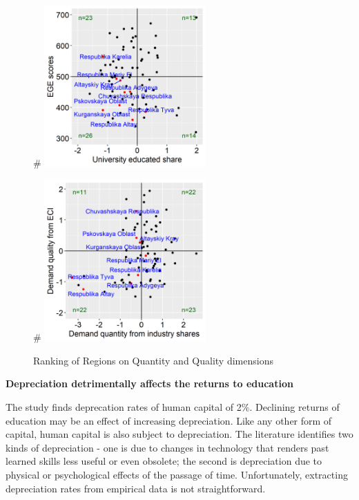 \documentclass[alpha-refs]{wiley-article-04t}
\begin{document}
\setcounter{table}{0}


\begin{figure}[htbp!]
	\begin{minipage}[b]{.5\linewidth}
		\centering
		#\hspace*{-0.2in}
		\includegraphics[width=175pt]{ranks1a.png}
	\end{minipage}
	\hfill
	\begin{minipage}[b]{.5\linewidth}
		\centering
		#\hspace*{-0.2in}
		\includegraphics[width=175pt]{ranks1b.png}
	\end{minipage}
	\caption{Ranking of Regions on Quantity and Quality 
	dimensions}\label{fig:4.2}
\end{figure}

\hspace{-1.75em} \textbf{Depreciation detrimentally affects the returns to 
education}

The study finds deprecation rates of human capital of 2\%. Declining 
returns of  education may be an effect of increasing depreciation. Like any 
other form of capital, human capital is also subject to depreciation. The 
literature identifies two kinds of depreciation - one is due to changes in 
technology that renders past learned skills less useful or even obsolete; 
the second is depreciation due to physical or psychological effects of the 
passage of time. Unfortunately, extracting depreciation rates from 
empirical data is not straightforward.
\end{document}
